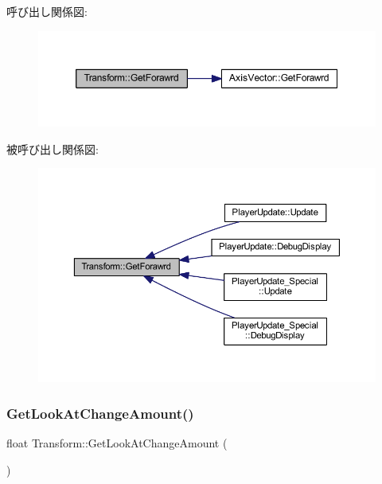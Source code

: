 呼び出し関係図\+:\nopagebreak
\begin{figure}[H]
\begin{center}
\leavevmode
\includegraphics[width=350pt]{class_transform_a25e4832e15334d74ff847f0ff0b3564f_cgraph}
\end{center}
\end{figure}
被呼び出し関係図\+:\nopagebreak
\begin{figure}[H]
\begin{center}
\leavevmode
\includegraphics[width=350pt]{class_transform_a25e4832e15334d74ff847f0ff0b3564f_icgraph}
\end{center}
\end{figure}
\mbox{\label{class_transform_a14b7b06632d6a47e99dc67aecbd7acc7}} 
\subsubsection{\texorpdfstring{Get\+Look\+At\+Change\+Amount()}{GetLookAtChangeAmount()}}
{\footnotesize\ttfamily float Transform\+::\+Get\+Look\+At\+Change\+Amount (\begin{DoxyParamCaption}{ }\end{DoxyParamCaption})\hspace{0.3cm}{\ttfamily [inline]}}



